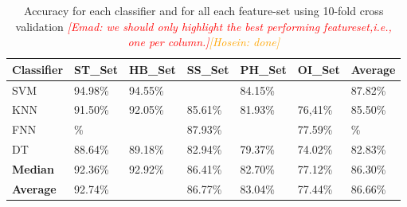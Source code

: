 \documentclass[journal,article,submit,moreauthors,pdftex]{Definitions/mdpi}
\newcommand{\emad}[1]{\textcolor{red}{{\it [Emad: #1]}}}
\newcommand{\hosein}[1]{\textcolor{orange}{{\it [Hosein: #1]}}}
\begin{document}
\begin{table}[H]
	\caption{Accuracy for each classifier and for all each feature-set using 10-fold cross validation \emad{we should only highlight the best performing featureset,i.e., one per column.}\hosein{done}}
	\centering
	\begin{tabular}{p{2cm}p{1.7cm}p{1.7cm}p{1.7cm}p{1.7cm}p{1.7cm}p{1.7cm}}
		\toprule
		\textbf{Classifier} & \textbf{ST\_Set} & \textbf{HB\_Set} & \textbf{SS\_Set} & \textbf{PH\_Set} & \textbf{OI\_Set} & Average \\
		\midrule
		SVM &  94.98\% & 94.55\% &\cellcolor{gray!35}{89.18\%} &84.15\% & \cellcolor{gray!35}{78.47\%} &87.82\%\\
		KNN & 91.50\% & 92.05\% & 85.61\% &81.93\% & 76,41\%& 85.50\% \\
		FNN & \cellcolor{gray!35}{95.31}\% & \cellcolor{gray!35}{95.89\%} &  87.93\% &\cellcolor{gray!35}{85.34\%} & 77.59\% & \cellcolor{gray!35}{89.04}\%\\
		DT & 88.64\% & 89.18\% &  82.94\% &79.37\% & 74.02\% &82.83\%\\
		\bottomrule
		\textbf{Median} & 92.36\% &  92.92\% &86.41\% & 82.70\% & 77.12\%&86.30\%\\
		\midrule
		\textbf{Average} & 92.74\% &  \cellcolor{gray!35}{93.30\%}  & 86.77\% &83.04\% & 77.44\% &86.66\%\\
		\bottomrule
	\end{tabular}
	\label{accuracy_classifier_featureset}
\end{table}
\end{document}
